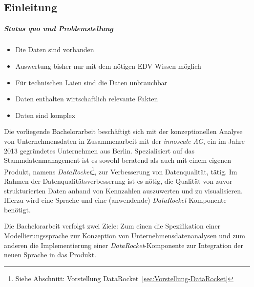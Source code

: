\documentclass[
  language=german, %
  type=bachelor%
]{isthesis}
\begin{document}
\begin{content}



  \chapter{Einleitung}

  \paragraph{Status quo und Problemstellung}
  \begin{itemize}
    \item Die Daten sind vorhanden
    \item Auswertung bisher nur mit dem nötigen EDV-Wissen möglich
    \item Für technischen Laien sind die Daten unbrauchbar
    \item Daten enthalten wirtschaftlich relevante Fakten
    \item Daten sind komplex
  \end{itemize}

  Die vorliegende  Bachelorarbeit beschäftigt sich mit der
  konzeptionellen Analyse von Unternehmensdaten in Zusammenarbeit mit der
  \textit{innoscale AG}, ein im Jahre 2013 gegründetes Unternehmen aus Berlin.
  Spezialisiert auf das Stammdatenmanagement ist es sowohl beratend als auch
  mit einem eigenen Produkt, namens \textit{DataRocket}\footnote{Siehe
  Abschnitt: Vorstellung DataRocket~\ref{sec:Vorstellung-DataRocket}}, zur
  Verbesserung von Datenqualität, tätig. Im Rahmen der
  Datenqualitätsverbesserung ist es nötig, die Qualität von zuvor
  strukturierten Daten anhand von Kennzahlen auszuwerten und zu visualisieren.
  Hierzu wird eine Sprache und eine (anwendende) \textit{DataRocket}-Komponente
  benötigt.

  Die Bachelorarbeit verfolgt zwei Ziele: Zum einen die Spezifikation einer
  Modellierungssprache zur Konzeption von Unternehmensdatenanalysen und zum
  anderen die Implementierung einer \textit{DataRocket}-Komponente zur
  Integration der neuen Sprache in das Produkt.


\end{content}
\end{document}
